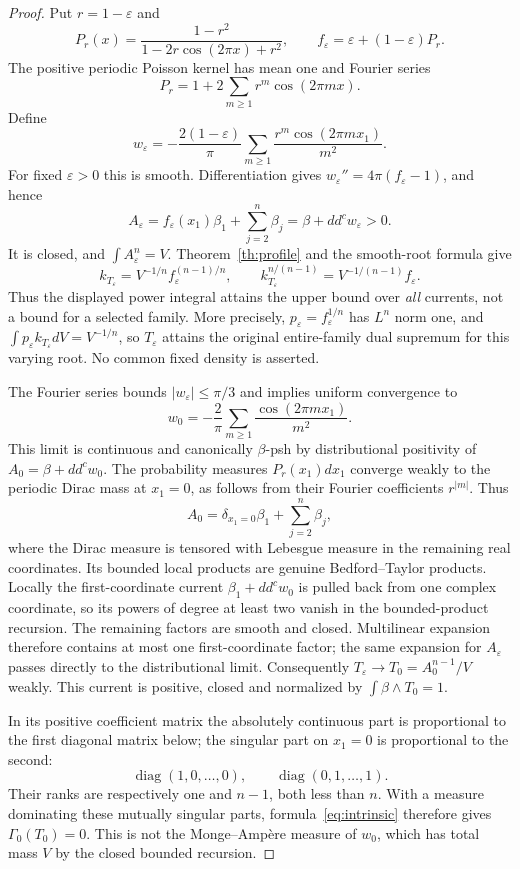 \documentclass[11pt]{article}
\newcommand{\ddc}{dd^c}
\theoremstyle{remark}\newtheorem{remark}[theorem]{Remark}
\begin{document}
\begin{proof}
Put $r=1-\varepsilon$ and
\[
 P_r(x)=\frac{1-r^2}{1-2r\cos(2\pi x)+r^2},\qquad
 f_\varepsilon=\varepsilon+(1-\varepsilon)P_r.
\]
The positive periodic Poisson kernel has mean one and Fourier series
\[
 P_r=1+2\sum_{m\geq1}r^m\cos(2\pi mx).
\]
Define
\[
 w_\varepsilon=-\frac{2(1-\varepsilon)}{\pi}
       \sum_{m\geq1}\frac{r^m\cos(2\pi mx_1)}{m^2}.
\]
For fixed $\varepsilon>0$ this is smooth. Differentiation gives
$w_\varepsilon''=4\pi(f_\varepsilon-1)$, and hence
\[
 A_\varepsilon=f_\varepsilon(x_1)\beta_1+
        \sum_{j=2}^n\beta_j=\beta+\ddc w_\varepsilon>0.
\]
It is closed, and $\int A_\varepsilon^n=V$.
Theorem~\ref{th:profile} and the smooth-root formula give
\[
 k_{T_\varepsilon}=V^{-1/n}f_\varepsilon^{(n-1)/n},
 \qquad k_{T_\varepsilon}^{n/(n-1)}
       =V^{-1/(n-1)}f_\varepsilon.
\]
Thus the displayed power integral attains the upper bound over
\emph{all} currents, not a bound for a selected family. More
precisely, $p_\varepsilon=f_\varepsilon^{1/n}$ has $L^n$ norm one,
and $\int p_\varepsilon k_{T_\varepsilon}dV=V^{-1/n}$, so
$T_\varepsilon$ attains the original entire-family dual supremum
for this varying root. No common fixed density is asserted.

The Fourier series bounds $|w_\varepsilon|\leq\pi/3$ and implies
uniform convergence to
\[
 w_0=-\frac2\pi\sum_{m\geq1}\frac{\cos(2\pi mx_1)}{m^2}.
\]
This limit is continuous and canonically $\beta$-psh by distributional
positivity of $A_0=\beta+\ddc w_0$.
The probability measures $P_r(x_1)dx_1$ converge weakly to the
periodic Dirac mass at $x_1=0$, as follows from their Fourier
coefficients $r^{|m|}$. Thus
\[
 A_0=\delta_{x_1=0}\beta_1+\sum_{j=2}^n\beta_j,
\]
where the Dirac measure is tensored with Lebesgue measure in the
remaining real coordinates. Its bounded local products are genuine
Bedford--Taylor products. Locally the first-coordinate current
$\beta_1+\ddc w_0$ is pulled back from one complex coordinate,
so its powers of degree at least two vanish in the bounded-product
recursion. The remaining factors are smooth and closed.
Multilinear expansion therefore contains at most one first-coordinate
factor; the same expansion for $A_\varepsilon$ passes directly to
the distributional limit. Consequently
$T_\varepsilon\to T_0=A_0^{n-1}/V$ weakly. This current is
positive, closed and normalized by $\int\beta\wedge T_0=1$.

In its positive coefficient matrix the absolutely continuous part is
proportional to the first diagonal matrix below; the singular part
on $x_1=0$ is proportional to the second:
\[
 \operatorname{diag}(1,0,\ldots,0),\qquad
 \operatorname{diag}(0,1,\ldots,1).
\]
Their ranks are respectively
one and $n-1$, both less than $n$. With a measure dominating these
mutually singular parts, formula~\eqref{eq:intrinsic} therefore gives
$\Gamma_0(T_0)=0$. This is not the Monge--Amp\`ere measure of
$w_0$, which has total mass $V$ by the closed bounded recursion.


\end{proof}
\end{document}
